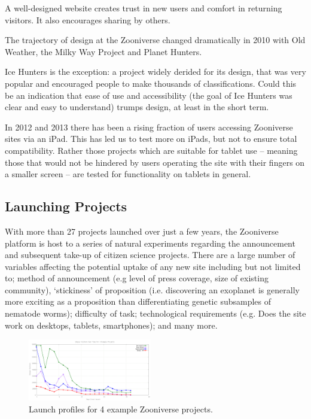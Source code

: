 \documentclass{sigchi}
\begin{document}
A well-designed website creates trust in new users and comfort in returning visitors. It also encourages sharing by others.

The trajectory of design at the Zooniverse changed dramatically in 2010 with Old Weather, the Milky Way Project and Planet Hunters. %

Ice Hunters is the exception: a project widely derided for its design, that was very popular and encouraged people to make thousands of classifications. Could this be an indication that ease of use and accessibility (the goal of Ice Hunters was clear and easy to understand) trumps design, at least in the short term.

In 2012 and 2013 there has been a rising fraction of users accessing Zooniverse sites via an iPad. This has led us to test more on iPads, but not to ensure total compatibility. Rather those projects which are suitable for tablet use -- meaning those that would not be hindered by users operating the site with their fingers on a smaller screen -- are tested for functionality on tablets in general.


\subsection{Launching Projects}

With more than 27 projects launched over just a few years, the Zooniverse platform is host to a series of natural experiments regarding the announcement and subsequent take-up of citizen science projects. There are a large number of variables affecting the potential uptake of any new site including but not limited to; method of announcement (e.g level of press coverage, size of existing community), `stickiness' of proposition (i.e. discovering an exoplanet is generally more exciting as a proposition than differentiating genetic subsamples of nematode worms); difficulty of task; technological requirements (e.g. Does the site work on desktops, tablets, smartphones); and many more.

\begin{figure}
\centering
\includegraphics[width=0.48\textwidth]{data/launch-profiles/launch-profiles.png}
\caption{Launch profiles for 4 example Zooniverse projects.}
\label{launchprofiles}
\end{figure}
\end{document}
